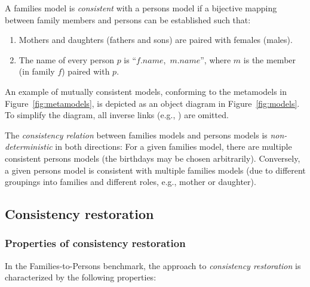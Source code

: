 A families model is \emph{consistent} with a persons model if a bijective mapping between family members and persons can be established such that:

\begin{enumerate}
	\item  Mothers and daughters (fathers and sons) are paired with females (males).
	\item  The name of every person $p$ is ``$f.name$,~$m.name$'', where $m$ is the member (in family $f$) paired with $p$.
\end{enumerate}

An example of mutually consistent models, conforming to the metamodels in Figure~\ref{fig:metamodels}, is depicted as an object diagram in Figure~\ref{fig:models}. 
To simplify the diagram, all inverse links (e.g., ) are omitted.

The \emph{consistency relation} between families models and persons models is \emph{non-deterministic} in both directions: For a given families model, there are multiple consistent persons models (the birthdays may be chosen arbitrarily). Conversely, a given persons model is consistent with multiple families models (due to different groupings into families and different roles, e.g., mother or daughter).

\subsection{Consistency restoration}
\label{sec:ConsistencyRestoration}

%

\subsubsection{Properties of consistency restoration}

In the Families-to-Persons benchmark, the approach to \emph{consistency restoration} is characterized by the following properties:

